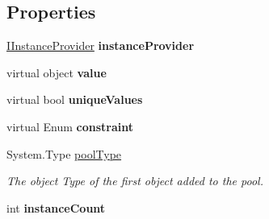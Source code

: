 \subsection*{Properties}
\begin{DoxyCompactItemize}
\item 
\hypertarget{classstrange_1_1extensions_1_1pool_1_1impl_1_1_pool_aa92fcb0df613f244078ac3b9bbea4c44}{\hyperlink{interfacestrange_1_1framework_1_1api_1_1_i_instance_provider}{I\-Instance\-Provider} {\bfseries instance\-Provider}}\label{classstrange_1_1extensions_1_1pool_1_1impl_1_1_pool_aa92fcb0df613f244078ac3b9bbea4c44}

\item 
\hypertarget{classstrange_1_1extensions_1_1pool_1_1impl_1_1_pool_aa550cf065bdb9336d92e7161d81d1bb0}{virtual object {\bfseries value}}\label{classstrange_1_1extensions_1_1pool_1_1impl_1_1_pool_aa550cf065bdb9336d92e7161d81d1bb0}

\item 
\hypertarget{classstrange_1_1extensions_1_1pool_1_1impl_1_1_pool_aeba1ffc6a5d99663ac73d4b63bf9949c}{virtual bool {\bfseries unique\-Values}}\label{classstrange_1_1extensions_1_1pool_1_1impl_1_1_pool_aeba1ffc6a5d99663ac73d4b63bf9949c}

\item 
\hypertarget{classstrange_1_1extensions_1_1pool_1_1impl_1_1_pool_a7d0c42c432697e1605d97c63c7000302}{virtual Enum {\bfseries constraint}}\label{classstrange_1_1extensions_1_1pool_1_1impl_1_1_pool_a7d0c42c432697e1605d97c63c7000302}

\item 
System.\-Type \hyperlink{classstrange_1_1extensions_1_1pool_1_1impl_1_1_pool_ac2babef4f2b79df84b13576ca2447643}{pool\-Type}
\begin{DoxyCompactList}\small\item\em The object Type of the first object added to the pool. \end{DoxyCompactList}\item 
\hypertarget{classstrange_1_1extensions_1_1pool_1_1impl_1_1_pool_ae374753b490c0fe6824c4b7a1eceab98}{int {\bfseries instance\-Count}}\label{classstrange_1_1extensions_1_1pool_1_1impl_1_1_pool_ae374753b490c0fe6824c4b7a1eceab98}


\end{DoxyCompactItemize}
